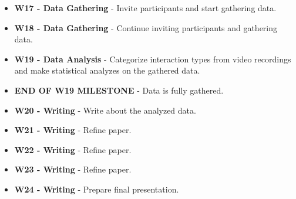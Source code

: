 \documentclass{sigchi}
\begin{document}
\begin{itemize}
  \item \textbf{W17 - Data Gathering } - Invite participants and start gathering data.
  \item \textbf{W18 - Data Gathering } - Continue inviting participants and  gathering data.
  \item \textbf{W19 - Data Analysis} - Categorize interaction types from video recordings and make statistical analyzes on the gathered data.
  \item \textbf{ END OF W19 MILESTONE } - Data is fully gathered.
  \item \textbf{W20 - Writing } - Write about the analyzed data.
  \item \textbf{W21 - Writing } - Refine paper.
  \item \textbf{W22 - Writing } - Refine paper.
  \item \textbf{W23 - Writing } - Refine paper.
  \item \textbf{W24 - Writing } - Prepare final presentation.

\end{itemize}



\end{document}
